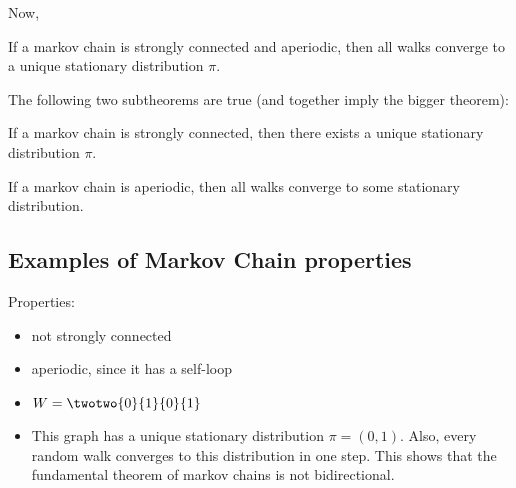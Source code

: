 Now, 
\begin{theorem}

If a markov chain is strongly connected and aperiodic, then all walks converge to a unique stationary distribution $\pi$.
\end{theorem}

The following two subtheorems are true (and together imply the bigger theorem):

\begin{theorem}
\thmlabel

If a markov chain is strongly connected, then there exists a unique stationary distribution $\pi$.
\end{theorem}

\begin{theorem}
\thmlabel

If a markov chain is aperiodic, then all walks converge to some stationary distribution.
\end{theorem}

\subsection{Examples of Markov Chain properties}

\begin{example}
\exlabel

\begin{center}
\end{center}
\end{example}

Properties:
\begin{itemize}
    \item not strongly connected
    \item aperiodic, since it has a self-loop
    \item $W=\twotwo{0}{1}{0}{1}$
    \item This graph has a unique stationary distribution $\pi = (0,1)$. Also, every random walk converges to this distribution in one step. This shows that the fundamental theorem of markov chains is not bidirectional. 
\end{itemize}

